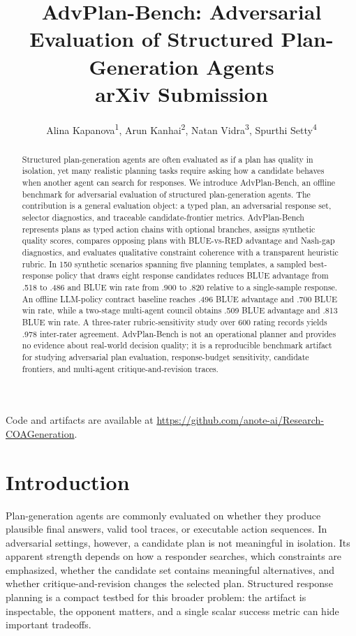 \documentclass[letterpaper]{article} %
\title{AdvPlan-Bench: Adversarial Evaluation of Structured Plan-Generation Agents\\
\Large arXiv Submission}
\author{
Alina Kapanova\textsuperscript{\rm 1},
Arun Kanhai\textsuperscript{\rm 2},
Natan Vidra\textsuperscript{\rm 3},
Spurthi Setty\textsuperscript{\rm 4}
}
\begin{document}
\maketitle

\begin{abstract}
Structured plan-generation agents are often evaluated as if a plan has quality in isolation, yet many realistic planning tasks require asking how a candidate behaves when another agent can search for responses. We introduce AdvPlan-Bench, an offline benchmark for adversarial evaluation of structured plan-generation agents. The contribution is a general evaluation object: a typed plan, an adversarial response set, selector diagnostics, and traceable candidate-frontier metrics. AdvPlan-Bench represents plans as typed action chains with optional branches, assigns synthetic quality scores, compares opposing plans with BLUE-vs-RED advantage and Nash-gap diagnostics, and evaluates qualitative constraint coherence with a transparent heuristic rubric. In 150 synthetic scenarios spanning five planning templates, a sampled best-response policy that draws eight response candidates reduces BLUE advantage from .518 to .486 and BLUE win rate from .900 to .820 relative to a single-sample response. An offline LLM-policy contract baseline reaches .496 BLUE advantage and .700 BLUE win rate, while a two-stage multi-agent council obtains .509 BLUE advantage and .813 BLUE win rate. A three-rater rubric-sensitivity study over 600 rating records yields .978 inter-rater agreement. AdvPlan-Bench is not an operational planner and provides no evidence about real-world decision quality; it is a reproducible benchmark artifact for studying adversarial plan evaluation, response-budget sensitivity, candidate frontiers, and multi-agent critique-and-revision traces.
\end{abstract}

Code and artifacts are available at \url{https://github.com/anote-ai/Research-COAGeneration}.

\section{Introduction}

Plan-generation agents are commonly evaluated on whether they produce plausible final answers, valid tool traces, or executable action sequences. In adversarial settings, however, a candidate plan is not meaningful in isolation. Its apparent strength depends on how a responder searches, which constraints are emphasized, whether the candidate set contains meaningful alternatives, and whether critique-and-revision changes the selected plan. Structured response planning is a compact testbed for this broader problem: the artifact is inspectable, the opponent matters, and a single scalar success metric can hide important tradeoffs.
\end{document}
